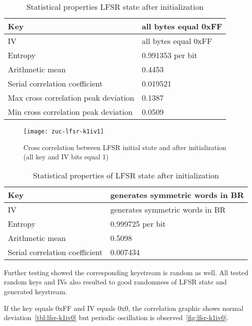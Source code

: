 \begin{table}[htbp]
    \centering
    \caption{Statistical properties LFSR state after initialization}
    \label{tbl:lfsr-k1iv1}
    \begin{tabular}{|l|l|} \hline
        Key & all bytes equal 0xFF \\ \hline
        IV & all bytes equal 0xFF \\ \hline
        Entropy & 0.991353 per bit \\ \hline
        Arithmetic mean & 0.4453 \\ \hline
        Serial correlation coefficient & 0.019521 \\ \hline
        Max cross correlation peak deviation & 0.1387 \\ \hline
        Min cross correlation peak deviation & 0.0509 \\ \hline
    \end{tabular}
\end{table}

\begin{figure}[htbp]
	\centering
	\texttt{[image: zuc-lfsr-k1iv1]}
	\caption{Cross correlation between LFSR initial state and after
    initialization (all key and IV bits equal 1)}
	\label{fig:lfsr-k1iv1}
\end{figure}

\begin{table}[htbp]
    \centering
    \caption{Statistical properties of LFSR state after initialization}
    \label{tbl:lfsr-symmetric}
    \begin{tabular}{|l|l|} \hline
        Key & generates symmetric words in BR \\ \hline
        IV & generates symmetric words in BR \\ \hline
        Entropy & 0.999725 per bit \\ \hline
        Arithmetic mean & 0.5098 \\ \hline
        Serial correlation coefficient & 0.007434 \\ \hline
    \end{tabular}
\end{table}

Further testing showed the corresponding keystream is random as well. All
tested random keys and IVs also resulted to good randomness of LFSR state and
generated keystream.  

If the key equals 0xFF and IV equals 0x0, the correlation
graphic shows normal deviation~\ref{tbl:lfsr-k1iv0} but periodic oscillation is
observed~\ref{fig:lfsr-k1iv0}.

